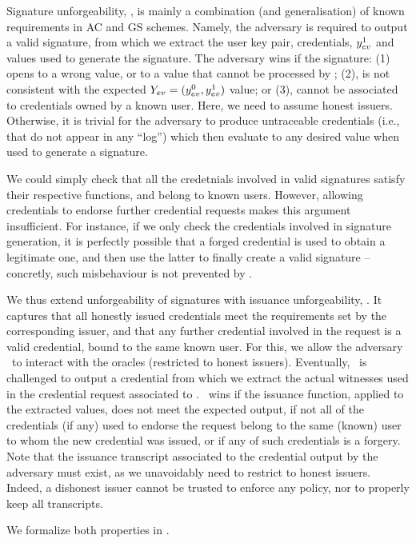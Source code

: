 Signature unforgeability, \ExpForgeSign, is mainly a combination (and
generalisation) of known requirements in AC and GS schemes. Namely, the
adversary is required to output a valid signature, from which we extract the
user key pair, credentials, $y_{ev}^1$ and \yinsp values used to generate the
signature. The adversary wins if the signature: (1) opens to a wrong value, or
to a value that cannot be processed by \Judge; (2), is not consistent with the
expected $Y_{ev} = (y_{ev}^0,y_{ev}^1)$ value; or (3), cannot be associated to
credentials owned by a known user. Here, we need to assume honest issuers.
Otherwise, it is trivial for the adversary to produce untraceable credentials
(i.e., that do not appear in any ``log'') which then evaluate to any desired
value when used to generate a signature.

We could simply check that all the credetnials involved in valid signatures
satisfy their respective \fissue functions, and belong to known users. However,
allowing credentials to endorse further credential requests makes this argument
insufficient. For instance, if we only check the credentials involved in
signature generation, it is perfectly possible that a forged credential is used
to obtain a legitimate one, and then use the latter to finally create a valid
signature -- concretly, such misbehaviour is not prevented by \ExpForgeSign. 

We thus extend unforgeability of signatures with issuance unforgeability,
\ExpForgeIssue. It captures that all honestly issued credentials meet the
requirements set by the corresponding issuer, and that any further credential
involved in the request is a valid credential, bound to the same known user. For
this, we allow the adversary \adv~to interact with the oracles (restricted to
honest issuers). Eventually, \adv~is challenged to output a credential \Cred
from which we extract the actual witnesses used in the credential request
associated to \cid. \adv~wins if the issuance function, applied to the extracted
values, does not meet the expected output, if not all of the credentials (if
any) used to endorse the request belong to the same (known) user to whom the new
credential was issued, or if any of such credentials is a forgery. Note that the
issuance transcript associated to the credential output by the adversary must
exist, as we unavoidably need to restrict to honest issuers. Indeed, a dishonest
issuer cannot be trusted to enforce any policy, nor to properly keep all
transcripts.

We formalize both properties in .

